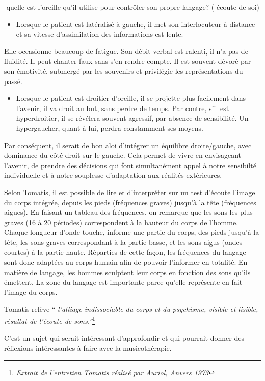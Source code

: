 -quelle est l'oreille qu'il utilise pour contrôler son propre langage?
( écoute de soi)
\begin{itemize}
\item Lorsque le patient est latéralisé à gauche, il met son interlocuteur
à distance et sa vitesse d'assimilation des informations est lente.
\end{itemize}
Elle occasionne beaucoup de fatigue. Son débit verbal est ralenti,
il n'a pas de fluidité. Il peut chanter faux sans s'en rendre compte.
Il est souvent dévoré par son émotivité, submergé par les souvenirs
et privilégie les représentations du passé.
\begin{itemize}
\item Lorsque le patient est droitier d'oreille, il se projette plus facilement
dans l'avenir, il va droit au but, sans perdre de temps. Par contre,
s'il est hyperdroitier, il se révélera souvent agressif, par absence
de sensibilité. Un hypergaucher, quant à lui, perdra constamment ses
moyens.
\end{itemize}
Par conséquent, il serait de bon aloi d'intégrer un équilibre droite/gauche,
avec dominance du côté droit sur le gauche. Cela permet de vivre en
envisageant l'avenir, de prendre des décisions qui font simultanément
appel à notre sensibilté individuelle et à notre souplesse d'adaptation
aux réalités extérieures.

Selon Tomatis, il est possible de lire et d'interpréter sur un test
d'écoute l'image du corps intégrée, depuis les pieds (fréquences graves)
jusqu'à la tête (fréquences aigues). En faisant un tableau des fréquences,
on remarque que les sons les plus graves (16 à 20 périodes) correspondent
à la hauteur du corps de l'homme. Chaque longueur d'onde touche, informe
une partie du corps, des pieds jusqu'à la tête, les sons graves correspondant
à la partie basse, et les sons aigus (ondes courtes) à la partie haute.
Réparties de cette façon, les fréquences du langage sont donc adaptées
au corps humain afin de pouvoir l'informer en totalité. En matière
de langage, les hommes sculptent leur corps en fonction des sons qu'ils
émettent. La zone du langage est importante parce qu'elle représente
en fait l'image du corps.

Tomatis relève ``\emph{ l'alliage indissociable du corps et du psychisme,
visible et lisible, résultat de l'écoute de sons.''}\footnote{\emph{Extrait de l'entretien Tomatis réalisé par Auriol, Anvers 1973}}

C'est un sujet qui serait intéressant d'approfondir et qui pourrait
donner des réflexions intéressantes à faire avec la musicothérapie.
